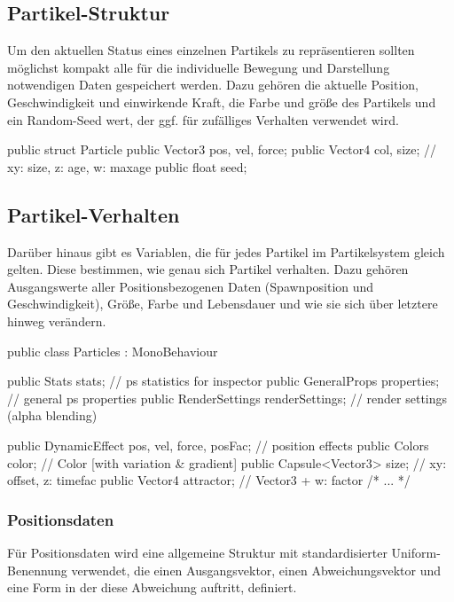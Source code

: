 \subsection{Partikel-Struktur}

Um den aktuellen Status eines einzelnen Partikels zu repräsentieren sollten möglichst kompakt alle für die individuelle Bewegung und Darstellung notwendigen Daten gespeichert werden. Dazu gehören die aktuelle Position, Geschwindigkeit und einwirkende Kraft, die Farbe und grö{\ss}e des Partikels und ein Random-Seed wert, der ggf. für zufälliges Verhalten verwendet wird.

\begin{csh}[caption=Partikelstruktur,label=lst:particle]
public struct Particle
{
    public Vector3 pos, vel, force;
    public Vector4 col, size; // xy: size,  z: age, w: maxage
    public float seed;
}
\end{csh}


\subsection{Partikel-Verhalten}

Darüber hinaus gibt es Variablen, die für jedes Partikel im Partikelsystem gleich gelten. Diese bestimmen, wie genau sich Partikel verhalten. Dazu gehören Ausgangswerte aller Positionsbezogenen Daten (Spawnposition und Geschwindigkeit), Grö{\ss}e, Farbe und Lebensdauer und wie sie sich über letztere hinweg verändern.

\begin{csh}
public class Particles : MonoBehaviour
{
    public Stats stats;                   // ps statistics for inspector
    public GeneralProps properties;       // general ps properties
    public RenderSettings renderSettings; // render settings (alpha blending)

    public DynamicEffect pos, vel, force, posFac; // position effects
    public Colors color;          // Color [with variation & gradient]
    public Capsule<Vector3> size; // xy: offset, z: timefac
    public Vector4 attractor;     // Vector3 + w: factor
    /* ... */
}
\end{csh}



\subsubsection{Positionsdaten}

Für Positionsdaten wird eine allgemeine Struktur mit standardisierter Uniform-Benennung verwendet, die einen Ausgangsvektor, einen Abweichungsvektor und eine Form in der diese Abweichung auftritt, definiert.

